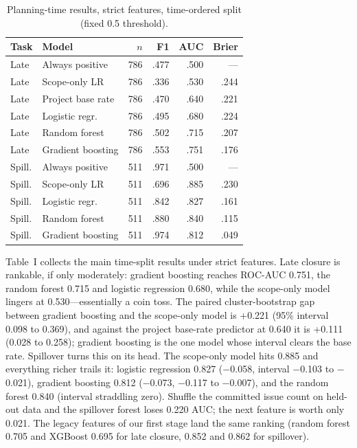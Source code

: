 \documentclass[conference]{IEEEtran}
\begin{document}
\begin{table}[!t]
\centering\scriptsize
\caption{Planning-time results, strict features, time-ordered split (fixed 0.5 threshold).}
\label{tab:main}
\setlength{\tabcolsep}{4pt}
\begin{tabular}{llrrrr}
\hline
Task & Model & $n$ & F1 & AUC & Brier\\
\hline
Late & Always positive & 786 & .477 & .500 & ---\\
Late & Scope-only LR & 786 & .336 & .530 & .244\\
Late & Project base rate & 786 & .470 & .640 & .221\\
Late & Logistic regr. & 786 & .495 & .680 & .224\\
Late & Random forest & 786 & .502 & .715 & .207\\
Late & Gradient boosting & 786 & .553 & .751 & .176\\
\hline
Spill. & Always positive & 511 & .971 & .500 & ---\\
Spill. & Scope-only LR & 511 & .696 & .885 & .230\\
Spill. & Logistic regr. & 511 & .842 & .827 & .161\\
Spill. & Random forest & 511 & .880 & .840 & .115\\
Spill. & Gradient boosting & 511 & .974 & .812 & .049\\
\hline
\end{tabular}
\end{table}

Table~I collects the main time-split results under strict features. Late closure is rankable, if only moderately: gradient boosting reaches ROC-AUC 0.751, the random forest 0.715 and logistic regression 0.680, while the scope-only model lingers at 0.530---essentially a coin toss. The paired cluster-bootstrap gap between gradient boosting and the scope-only model is +0.221 (95\% interval 0.098 to 0.369), and against the project base-rate predictor at 0.640 it is +0.111 (0.028 to 0.258); gradient boosting is the one model whose interval clears the base rate. Spillover turns this on its head. The scope-only model hits 0.885 and everything richer trails it: logistic regression 0.827 ($-$0.058, interval $-$0.103 to $-$0.021), gradient boosting 0.812 ($-$0.073, $-$0.117 to $-$0.007), and the random forest 0.840 (interval straddling zero). Shuffle the committed issue count on held-out data and the spillover forest loses 0.220 AUC; the next feature is worth only 0.021. The legacy features of our first stage land the same ranking (random forest 0.705 and XGBoost 0.695 for late closure, 0.852 and 0.862 for spillover).
\end{document}
